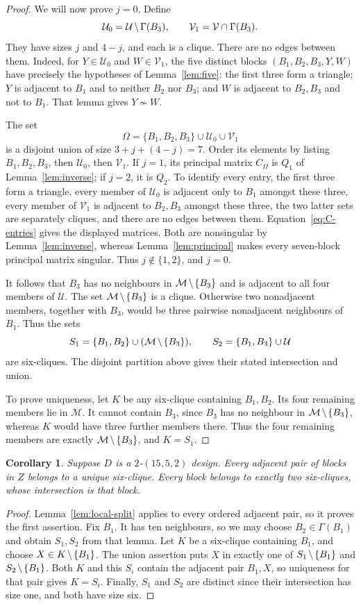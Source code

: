 \documentclass[11pt]{article}
\newcommand\cM{{\mathcal M}}
\newcommand\cU{{\mathcal U}}
\newcommand\cV{{\mathcal V}}
\newcommand\diff{\mathbin{\mkern-1.5mu\setminus\mkern-1.5mu}}%
\newtheorem{corollary}[theorem]{Corollary}
\theoremstyle{definition}
\begin{document}
\begin{proof}
We will now prove $j=0$. Define
\[
 \cU_0=\cU\diff\Gamma(B_3),\qquad
 \cV_1=\cV\cap\Gamma(B_3).
\]
They have sizes $j$ and $4-j$, and each is a clique. There are no edges
between them. Indeed, for $Y\in\cU_0$ and $W\in\cV_1$, the five
distinct blocks $(B_1,B_2,B_3,Y,W)$ have precisely the hypotheses of
Lemma~\ref{lem:five}: the first three form a triangle; $Y$ is adjacent
to $B_1$ and to neither $B_2$ nor $B_3$; and $W$ is adjacent to $B_2,B_3$
and not to $B_1$. That lemma gives $Y\not\sim W$.

The set
\[
 \Omega=\{B_1,B_2,B_3\}\cup\cU_0\cup\cV_1
\]
is a disjoint union of size $3+j+(4-j)=7$. Order its elements by listing
$B_1,B_2,B_3$, then $\cU_0$, then $\cV_1$. If $j=1$, its principal
matrix $C_\Omega$ is $Q_1$ of Lemma~\ref{lem:inverse}; if $j=2$, it is $Q_2$.
To identify every entry, the first three form a triangle, every member
of $\cU_0$ is adjacent only to $B_1$ amongst these three, every member of
$\cV_1$ is adjacent to $B_2,B_3$ amongst these three, the two latter sets
are separately cliques, and there are no edges between them.
Equation~\eqref{eq:C-entries} gives the displayed matrices. Both are
nonsingular by Lemma~\ref{lem:inverse}, whereas
Lemma~\ref{lem:principal} makes every seven-block principal matrix
singular. Thus $j\notin\{1,2\}$, and $j=0$.

It follows that $B_3$ has no neighbours in $\cM\diff\{B_3\}$ and is
adjacent to all four members of $\cU$. The set
$\cM\diff\{B_3\}$ is a clique. Otherwise two nonadjacent members,
together with $B_3$, would be three pairwise nonadjacent neighbours of
$B_1$. Thus the sets
\[
 S_1=\{B_1,B_2\}\cup(\cM\diff\{B_3\}),\qquad
 S_2=\{B_1,B_3\}\cup\cU
\]
are six-cliques. The disjoint partition above gives their stated
intersection and union.

To prove uniqueness, let $K$ be any six-clique containing $B_1,B_2$.
Its four remaining members lie in $\cM$. It cannot contain $B_3$,
since $B_3$ has no neighbour in $\cM\diff\{B_3\}$, whereas $K$ would
have three further members there. Thus the four remaining members are
exactly $\cM\diff\{B_3\}$, and $K=S_1$.
\end{proof}

\begin{corollary}\label{cor:two-cliques}
Suppose $D$ is a $2$-$(15,5,2)$ design. Every adjacent pair of blocks in
$Z$ belongs to a unique six-clique. Every block belongs to exactly two
six-cliques, whose intersection is that block.
\end{corollary}
\begin{proof}
Lemma~\ref{lem:local-split} applies to every ordered adjacent pair, so
it proves the first assertion. Fix $B_1$. It has ten neighbours, so we
may choose $B_2\in\Gamma(B_1)$ and obtain $S_1,S_2$ from that lemma.
Let $K$ be a six-clique containing $B_1$, and choose
$X\in K\diff\{B_1\}$. The union assertion puts $X$ in exactly one of
$S_1\diff\{B_1\}$ and $S_2\diff\{B_1\}$. Both $K$ and this $S_i$
contain the adjacent pair $B_1,X$, so uniqueness for that pair gives
$K=S_i$. Finally, $S_1$ and $S_2$ are distinct since their intersection
has size one, and both have size six.
\end{proof}
\end{document}
